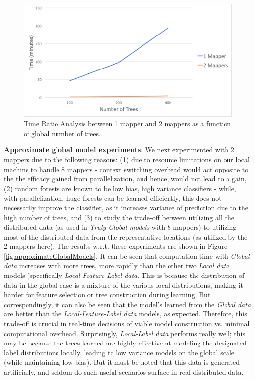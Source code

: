 \documentclass{sig-alternate-05-2015}
\begin{document}
\begin{figure}[t]
\includegraphics[scale=0.5]{figures/TimeRatioAnalysis.png}
\centering
\caption{Time Ratio Analysis between 1 mapper and 2 mappers as a function of global number of trees.}
\label{fig:timeRatio}
\end{figure}

\textbf{Approximate global model experiments:} We next experimented with 2 mappers due to the following reasons: (1) due to resource limitations on our local machine to handle 8 mappers - context switching overhead would act opposite to the the efficacy gained from parallelization, and hence, would not lead to a gain, (2) random forests are known to be low bias, high variance classifiers - while, with parallelization, huge forests can be learned efficiently, this does not necessarily improve the classifier, as it increases variance of prediction due to the high number of trees, and (3) to study the trade-off between utilizing all the distributed data (as used in \textit{Truly Global models} with 8 mappers) to utilizing most of the distributed data from the representative locations (as utilized by the 2 mappers here). The results w.r.t. these experiments are shown in Figure \ref{fig:approximateGlobalModels}. It can be seen that computation time with \textit{Global data} increases with more trees, more rapidly than the other two \textit{Local data} models (specifically \textit{Local-Feature-Label data}. This is because the distribution of data in the global case is a mixture of the various local distributions, making it harder for feature selection or tree construction during learning. But correspondingly, it can also be seen that the model's learned from the \textit{Global data} are better than the \textit{Local-Feature-Label data} models, as expected. Therefore, this trade-off is crucial in real-time decisions of viable model construction vs. minimal computational overhead. Surprisingly, \textit{Local-Label data} performs really well; this may be because the trees learned are highly effective at modeling the designated label distributions locally, leading to low variance models on the global scale (while maintaining low bias). But it must be noted that this data is generated artificially, and seldom do such useful scenarios surface in real distributed data.
\end{document}
